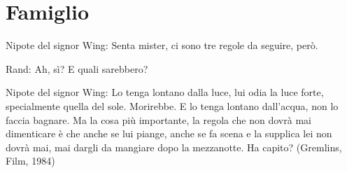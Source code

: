 \section{Famiglio}\label{famiglio}\hypertarget{famiglio}{}

\medskip

\begin{changemargin}{0.3cm}{0.3cm}\begin{enfasi}{
Nipote del signor Wing: Senta mister, ci sono tre regole da seguire, però.

Rand: Ah, sì? E quali sarebbero?

Nipote del signor Wing: Lo tenga lontano dalla luce, lui odia la luce forte, specialmente quella del sole. Morirebbe. E lo tenga lontano dall'acqua, non lo faccia bagnare. Ma la cosa più importante, la regola che non dovrà mai dimenticare è che anche se lui piange, anche se fa scena e la supplica lei non dovrà mai, mai dargli da mangiare dopo la mezzanotte. Ha capito? (Gremlins, Film, 1984)}
\end{enfasi}\end{changemargin}\medskip

